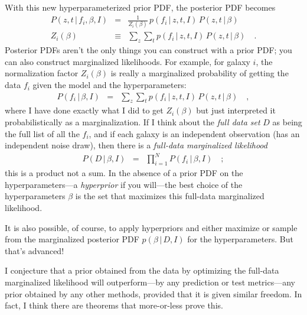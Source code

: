 \documentclass[12pt]{article}
\newcommand{\given}{\,|\,}
\begin{document}
With this new hyper\-parameterized prior PDF, the posterior PDF becomes
\begin{eqnarray}\displaystyle
P(z, t \given f_i, \beta, I) &=&
  \frac{1}{Z_i(\beta)}\,p(f_i \given z, t, I)\,P(z, t \given \beta)
\\
Z_i(\beta) &\equiv& \sum_z\sum_t p(f_i \given z, t, I)\,P(z, t \given \beta)
\quad .
\end{eqnarray}
Posterior PDFs aren't the only things you can construct with a prior
PDF; you can also construct marginalized likelihoods.  For example,
for galaxy $i$, the normalization factor $Z_i(\beta)$ is really a
marginalized probability of getting the data $f_i$ given the model and
the hyper\-parameters:
\begin{eqnarray}\displaystyle
P(f_i \given \beta, I) &=&
  \sum_z\sum_t p(f_i \given z, t, I)\,P(z, t \given \beta)
\quad ,
\end{eqnarray}
where I have done exactly what I did to get $Z_i(\beta)$ but just
interpreted it probabilistically as a marginalization.  If I think
about the \emph{full data set} $D$ as being the full list of all the
$f_i$, and if each galaxy is an independent observation (has an
independent noise draw), then there is a \emph{full-data marginalized
  likelihood}
\begin{eqnarray}\displaystyle
P(D \given \beta, I) &=&
  \prod_{i=1}^N P(f_i \given \beta, I)
\quad ;
\end{eqnarray}
this is a product not a sum.  In the absence of a prior PDF on the
hyper\-parameters---a \emph{hyperprior} if you will---the best choice of
the hyper\-parameters $\beta$ is the set that maximizes this full-data
marginalized likelihood.

It is also possible, of course, to apply hyper\-priors and either
maximize or sample from the marginalized posterior PDF $p(\beta \given
D, I)$ for the hyper\-parameters.  But that's advanced!

I conjecture that a prior obtained from the data by optimizing the
full-data marginalized likelihood will outperform---by any prediction
or test metrics---any prior obtained by any other methods, provided
that it is given similar freedom.  In fact, I think there are theorems
that more-or-less prove this.
\end{document}
